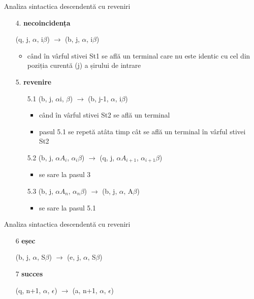 \documentclass[pdf]{beamer}
\begin{document}
\begin{frame}{Analiza sintactica descendentă cu reveniri}
\begin{enumerate}
\item[4.]
\textbf{necoincidența}

(q, j, $\alpha$, i$\beta$) $\rightarrow$ (b, j, $\alpha$, i$\beta$)

\begin{itemize}
\item
când în vârful stivei St1 se află un terminal care nu este identic cu cel din poziția curentă (j) a șirului de intrare
\end{itemize}

\item[5.]
\textbf{revenire}

\begin{enumerate}
\item[5.1]
(b, j, $\alpha$i, $\beta$) $\rightarrow$ (b, j-1, $\alpha$, i$\beta$)

\begin{itemize}
\item
când în vârful stivei St2 se află un terminal
\item
pasul 5.1 se repetă atâta timp cât se află un terminal în vârful stivei St2
\end{itemize}

\item[5.2]
(b, j, $\alpha A_i$, $\alpha_i\beta$) $\rightarrow$ (q, j, $\alpha A_{i+1}$, $\alpha_{i+1}\beta$)

\begin{itemize}
\item
se sare la pasul 3
\end{itemize}

\item[5.3]
(b, j, $\alpha A_n$, $\alpha_n\beta$) $\rightarrow$ (b, j, $\alpha$, A$\beta$)

\begin{itemize}
\item
se sare la pasul 5.1
\end{itemize}


\end{enumerate}
\end{enumerate}
\end{frame}



\begin{frame}{Analiza sintactica descendentă cu reveniri}
\begin{enumerate}
\item[6]
\textbf{eșec}

(b, j, $\alpha$, S$\beta$) $\rightarrow$ (e, j, $\alpha$, S$\beta$)

\item[7]
\textbf{succes}

(q, n+1, $\alpha$, $\epsilon$) $\rightarrow$ (a, n+1, $\alpha$, $\epsilon$)
\end{enumerate}
\end{frame}
\end{document}
